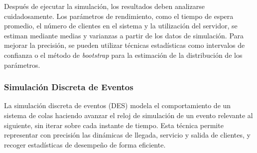 \documentclass{article}
\begin{document}
\begin{itemize}
    Después de ejecutar la simulación, los resultados deben analizarse cuidadosamente. Los parámetros de rendimiento, como el tiempo de espera promedio, el número de clientes en el sistema y la utilización del servidor, se estiman mediante medias y varianzas a partir de los datos de simulación. Para mejorar la precisión, se pueden utilizar técnicas estadísticas como intervalos de confianza o el método de \textit{bootstrap} para la estimación de la distribución de los parámetros.

\end{itemize}

\subsubsection{Simulación Discreta de Eventos}
La simulación discreta de eventos (DES) modela el comportamiento de un sistema de colas haciendo avanzar el reloj de simulación de un evento relevante al siguiente, sin iterar sobre cada instante de tiempo. Esta técnica permite representar con precisión las dinámicas de llegada, servicio y salida de clientes, y recoger estadísticas de desempeño de forma eficiente.
\end{document}
